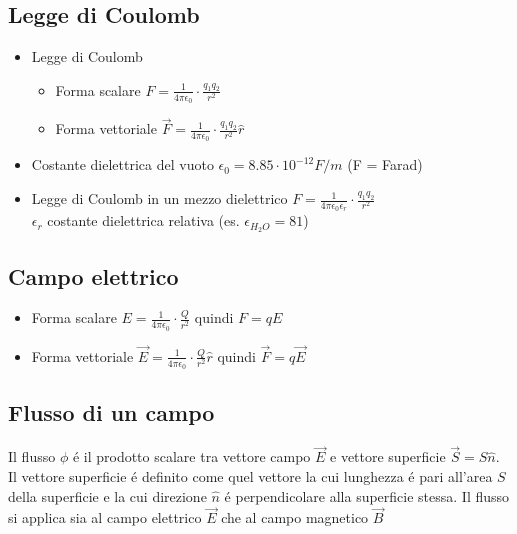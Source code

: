 \documentclass[17pt]{extarticle}
\begin{document}
\subsection{Legge di Coulomb}


\begin{itemize}
	\item Legge di Coulomb         
		\begin{itemize}
			\item Forma scalare $F = \frac{1}{4\pi\epsilon_0}\cdot\frac{q_1q_2}{r^2}$
			\item Forma vettoriale $\vec{F} = \frac{1}{4\pi\epsilon_0}\cdot\frac{q_1q_2}{r^2}\hat{r}$
		\end{itemize}			
	  
	\item Costante dielettrica del vuoto        $\epsilon_0 = 8.85\cdot 10^{-12}F/m$   (F = Farad)
	\item Legge di Coulomb in un mezzo dielettrico       $F = \frac{1}{4\pi\epsilon_0\epsilon_r}\cdot\frac{q_1q_2}{r^2}$ \\ $\epsilon_r$ costante dielettrica relativa (es. $\epsilon_{H_2O} = 81$)
\end{itemize}

\subsection{Campo elettrico}

      
\begin{itemize}
	\item Forma scalare $E = \frac{1}{4\pi\epsilon_0}\cdot\frac{Q}{r^2}$ quindi $F = qE$
	\item Forma vettoriale $\vec{E} = \frac{1}{4\pi\epsilon_0}\cdot\frac{Q}{r^2}\hat{r}$ quindi $\vec{F} = q\vec{E}$
\end{itemize}			



\subsection{Flusso di un campo}
Il flusso $\phi$ \'e il prodotto scalare tra vettore campo $\vec{E}$ e vettore superficie $\vec{S}=S\hat{n}$. Il vettore superficie \'e definito come quel vettore la cui lunghezza \'e pari all'area $S$ della superficie e la cui direzione $\hat{n}$ \'e perpendicolare alla superficie stessa. Il flusso si applica sia al campo elettrico $\vec{E}$ che al campo magnetico $\vec{B}$
\end{document}
